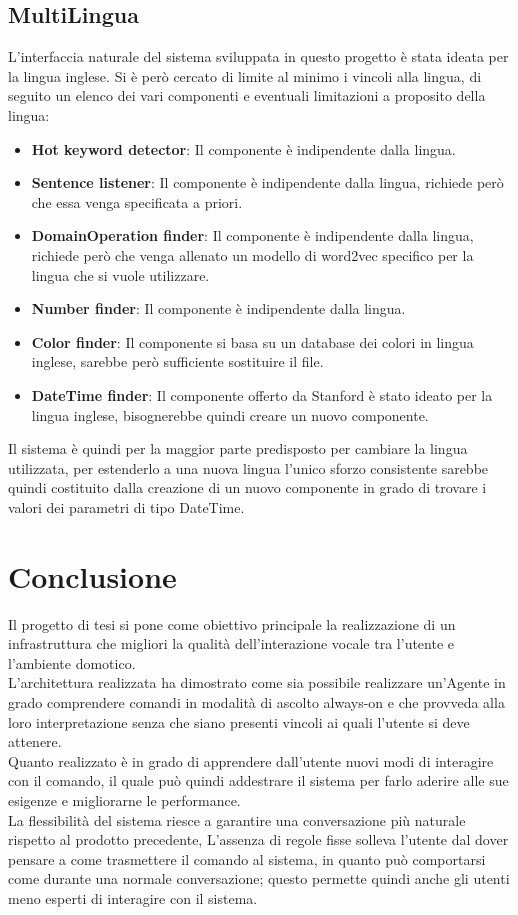 \documentclass[twoside]{supsistudent}
\begin{document}
\section{MultiLingua}
L'interfaccia naturale del sistema sviluppata in questo progetto è stata ideata per la lingua inglese. Si è però cercato di limite al minimo i vincoli alla lingua, di seguito un elenco dei vari componenti e eventuali limitazioni a proposito della lingua:
\begin{itemize}
      \item \textbf{Hot keyword detector}: Il componente è indipendente dalla lingua.
      \item \textbf{Sentence listener}: Il componente è indipendente dalla lingua, richiede però che essa venga specificata a priori.
      \item \textbf{DomainOperation finder}: Il componente è indipendente dalla lingua, richiede però che venga allenato un modello di word2vec specifico per la lingua che si vuole utilizzare.
      \item \textbf{Number finder}: Il componente è indipendente dalla lingua.
      \item \textbf{Color finder}: Il componente si basa su un database dei colori in lingua inglese, sarebbe però sufficiente sostituire il file.
      \item \textbf{DateTime finder}: Il componente offerto da Stanford è stato ideato per la lingua inglese, bisognerebbe quindi creare un nuovo componente.
\end{itemize}
Il sistema è quindi per la maggior parte predisposto per cambiare la lingua utilizzata, per estenderlo a una nuova lingua l'unico sforzo consistente sarebbe quindi costituito dalla creazione di un nuovo componente in grado di trovare i valori dei parametri di tipo DateTime.
\chapter{Conclusione}
Il progetto di tesi si pone come obiettivo principale la realizzazione di un infrastruttura che migliori la qualità dell'interazione vocale tra l'utente e l'ambiente domotico.\\
L'architettura realizzata ha dimostrato come sia possibile realizzare un'Agente in grado comprendere comandi in modalità di ascolto always-on e che provveda alla loro interpretazione senza che siano presenti vincoli ai quali l'utente si deve attenere.\\
Quanto realizzato è in grado di apprendere dall'utente nuovi modi di interagire con il comando, il quale può quindi addestrare il sistema per farlo aderire alle sue esigenze e migliorarne le performance.\\
La flessibilità del sistema riesce a garantire una conversazione più naturale rispetto al prodotto precedente, 
L’assenza di regole fisse solleva l’utente dal dover pensare a come trasmettere il comando al sistema, in quanto può comportarsi come durante una normale conversazione; questo permette quindi anche gli utenti meno esperti di interagire con il sistema.\\
\end{document}
